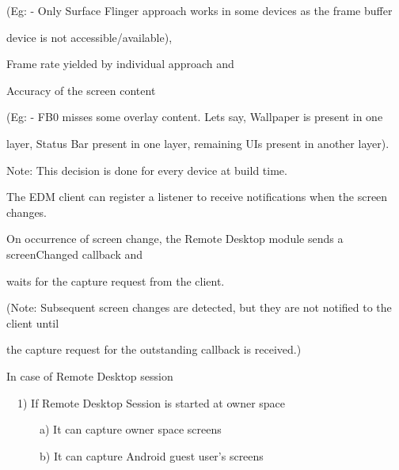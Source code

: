 (\-Eg\-: -\/ \-Only \-Surface \-Flinger approach works in some devices as the frame buffer

device is not accessible/available),\par



\begin{DoxyItemize}
\item \-Frame rate yielded by individual approach and \par

\end{DoxyItemize}


\begin{DoxyItemize}
\item \-Accuracy of the screen content \par

\end{DoxyItemize}

(\-Eg\-: -\/ \-F\-B0 misses some overlay content. \-Lets say, \-Wallpaper is present in one

layer, \-Status \-Bar present in one layer, remaining \-U\-Is present in another layer). \par


\-Note\-: \-This decision is done for every device at build time.\par


\-The \-E\-D\-M client can register a listener to receive notifications when the screen changes.

\-On occurrence of screen change, the \-Remote \-Desktop module sends a screen\-Changed callback and

waits for the capture request from the client.

(\-Note\-: \-Subsequent screen changes are detected, but they are not notified to the client until

the capture request for the outstanding callback is received.)\par


\par


\-In case of \-Remote \-Desktop session\par


~~1) \-If \-Remote \-Desktop \-Session is started at owner space\par


~~~~~~a) \-It can capture owner space screens\par


~~~~~~b) \-It can capture \-Android guest user's screens\par


